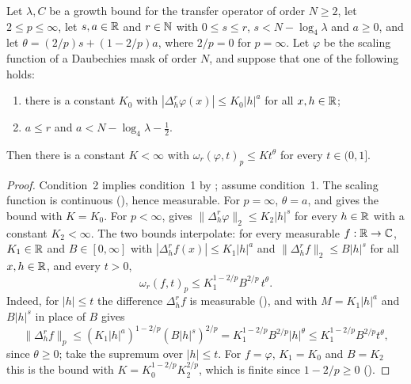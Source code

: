 \begin{theorem}
\label{thm:daub-modulus-interp}
\leanok
{}
Let $\lambda, C$ be a growth bound for the transfer operator of order $N \geq 2$, let
$2 \leq p \leq \infty$, let $s, a \in \mathbb{R}$ and $r \in \mathbb{N}$ with $0 \leq s \leq r$,
$s < N - \log_4 \lambda$ and $a \geq 0$, and let $\theta = (2/p) s + (1 - 2/p) a$, where
$2/p = 0$ for $p = \infty$. Let $\varphi$ be the scaling function of a Daubechies mask of order
$N$, and suppose that one of the following holds:
\begin{enumerate}
  \item there is a constant $K_0$ with $|\Delta_h^r \varphi(x)| \leq K_0 |h|^a$ for all
    $x, h \in \mathbb{R}$;
  \item $a \leq r$ and $a < N - \log_4 \lambda - \frac12$.
\end{enumerate}
Then there is a constant $K < \infty$ with $\omega_r(\varphi, t)_p \leq K t^\theta$ for every
$t \in (0, 1]$.
\end{theorem}

\begin{proof}
\leanok
{}
Condition~2 implies condition~1 by ; assume
condition~1. The scaling function is continuous (), hence
measurable. For $p = \infty$, $\theta = a$, and  gives the
bound with $K = K_0$. For $p < \infty$,  gives
$\|\Delta_h^r \varphi\|_2 \leq K_2 |h|^s$ for every $h \in \mathbb{R}$ with a constant $K_2 < \infty$.
The two bounds interpolate: for every measurable $f : \mathbb{R} \to \mathbb{C}$, $K_1 \in \mathbb{R}$ and
$B \in [0, \infty]$ with $|\Delta_h^r f(x)| \leq K_1 |h|^a$ and
$\|\Delta_h^r f\|_2 \leq B |h|^s$ for all $x, h \in \mathbb{R}$, and every $t > 0$,
\[
  \omega_r(f, t)_p \leq K_1^{1 - 2/p} B^{2/p} \, t^\theta .
\]
Indeed, for $|h| \leq t$ the difference $\Delta_h^r f$ is measurable
(), and  with $M = K_1 |h|^a$ and
$B |h|^s$ in place of $B$ gives
\[
  \|\Delta_h^r f\|_p \leq (K_1 |h|^a)^{1 - 2/p} (B |h|^s)^{2/p} = K_1^{1 - 2/p} B^{2/p} |h|^\theta
  \leq K_1^{1 - 2/p} B^{2/p} t^\theta ,
\]
since $\theta \geq 0$; take the supremum over $|h| \leq t$. For $f = \varphi$, $K_1 = K_0$ and
$B = K_2$ this is the bound with $K = K_0^{1 - 2/p} K_2^{2/p}$, which is finite since
$1 - 2/p \geq 0$ ().
\end{proof}

